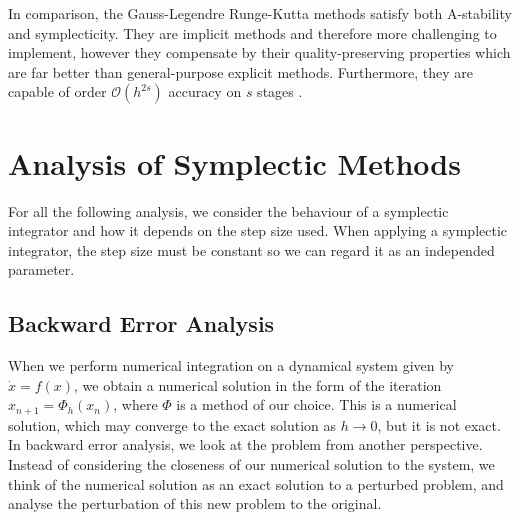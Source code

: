 In comparison, the Gauss-Legendre Runge-Kutta methods satisfy both A-stability and symplecticity.
They are implicit methods and therefore more challenging to implement,
however they compensate by their quality-preserving properties which are far better than general-purpose explicit methods.
Furthermore, they are capable of order $\mathcal{O}(h^{2s})$ accuracy on $s$ stages \cite{iserles2009rk}.

\section{Analysis of Symplectic Methods}

For all the following analysis, we consider the behaviour of a symplectic integrator and how it depends on the step size used.
When applying a symplectic integrator, the step size must be constant \cite{Casas_2016} so we can regard it as an independed parameter.

\subsection{Backward Error Analysis}

When we perform numerical integration on a dynamical system given by $\dot{x} = f(x)$,
we obtain a numerical solution in the form of the iteration $x_{n+1} = \Phi_h(x_n)$,
where $\Phi$ is a method of our choice.
This is a numerical solution, which may converge to the exact solution as $h \rightarrow 0$,
but it is not exact.
In backward error analysis, we look at the problem from another perspective.
Instead of considering the closeness of our numerical solution to the system,
we think of the numerical solution as an exact solution to a perturbed problem,
and analyse the perturbation of this new problem to the original.

